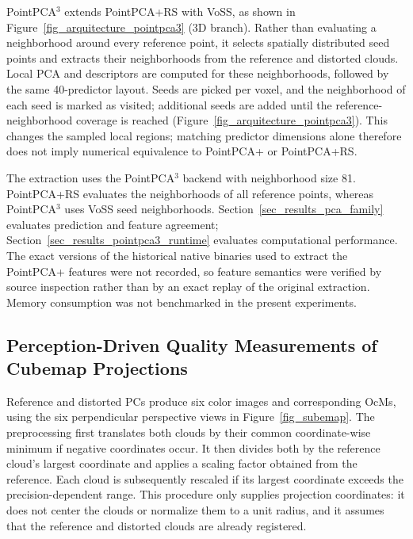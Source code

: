 \documentclass[final,3p,times,twocolumn]{elsarticle}
\begin{document}
PointPCA$^3$ extends PointPCA+RS with \gls{VoSS}, as shown in Figure~\ref{fig_arquitecture_pointpca3} (3D branch). Rather than evaluating a neighborhood around every reference point, it selects spatially distributed seed points and extracts their neighborhoods from the reference and distorted clouds. Local PCA and descriptors are computed for these neighborhoods, followed by the same 40-predictor layout. Seeds are picked per voxel, and the neighborhood of each seed is marked as visited; additional seeds are added until the reference-neighborhood coverage is reached (Figure~\ref{fig_arquitecture_pointpca3}). This changes the sampled local regions; matching predictor dimensions alone therefore does not imply numerical equivalence to PointPCA+ or PointPCA+RS.



The extraction uses the PointPCA$^3$ backend with neighborhood size 81. PointPCA+RS evaluates the neighborhoods of all reference points, whereas PointPCA$^3$ uses \gls{VoSS} seed neighborhoods. Section~\ref{sec_results_pca_family} evaluates prediction and feature agreement; Section~\ref{sec_results_pointpca3_runtime} evaluates computational performance. The exact versions of the historical native binaries used to extract the PointPCA+ features were not recorded, so feature semantics were verified by source inspection rather than by an exact replay of the original extraction. Memory consumption was not benchmarked in the present experiments.

\subsection{Perception-Driven Quality Measurements of Cubemap Projections} \label{sec_cmp}

Reference and distorted \glspl{PC} produce six color images and corresponding \glspl{OcM}, using the six perpendicular perspective views in Figure~\ref{fig_subemap}. The preprocessing first translates both clouds by their common coordinate-wise minimum if negative coordinates occur. It then divides both by the reference cloud's largest coordinate and applies a scaling factor obtained from the reference. Each cloud is subsequently rescaled if its largest coordinate exceeds the precision-dependent range. This procedure only supplies projection coordinates: it does not center the clouds or normalize them to a unit radius, and it assumes that the reference and distorted clouds are already registered.
\end{document}
